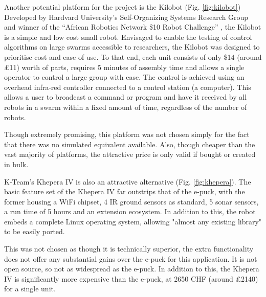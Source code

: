 Another potential platform for the project is the Kilobot (Fig. \ref{fig:kilobot}) Developed by Hardvard University's Self-Organizing Systems Research Group and winner of the ``African Robotics Network \$10 Robot Challenge'' \cite{afron}, the Kilobot is a simple and low cost small robot. Envisaged to enable the testing of control algorithms on large swarms accessible to researchers, the Kilobot was designed to prioritise cost and ease of use.  \cite{kilobot} To that end, each unit consists of only \$14 (around \pounds11) worth of parts, requires 5 minutes of assembly time and allows a single operator to control a large group with ease. The control is achieved using an overhead infra-red controller connected to a control station (a computer). This allows a user to broadcast a command or program and have it received by all robots in a swarm within a fixed amount of time, regardless of the number of robots.

Though extremely promising, this platform was not chosen simply for the fact that there was no simulated equivalent available. Also, though cheaper than the vast majority of platforms, the attractive price is only valid if bought or created in bulk.

K-Team's Khepera IV is also an attractive alternative (Fig. \ref{fig:khepera}). The basic feature set of the Khepera IV far outstrips that of the e-puck, with the former housing a WiFi chipset, 4 IR ground sensors as standard, 5 sonar sensors, a run time of 5 hours and an extension ecosystem. In addition to this, the robot embeds a complete Linux operating system, allowing "almost any existing library" to be easily ported. \cite{khepera}

This was not chosen as though it is technically superior, the extra functionality does not offer any substantial gains over the e-puck for this application. It is not open source, so not as widespread as the e-puck. In addition to this, the Khepera IV is significantly more expensive than the e-puck, at 2650 CHF (around \pounds2140) for a single unit.

